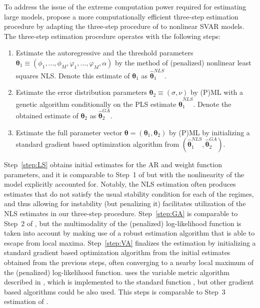 \documentclass[nojss]{jss}
\begin{document}
To address the issue of the extreme computation power required for estimating large models, \cite{Virolainen2:2024} propose a more computationally efficient three-step estimation procedure by adapting the three-step procedure of \cite{Lanne+Meitz+Saikkonen:2017} to nonlinear SVAR models. The three-step estimation procedure operates with the following steps:
\begin{enumerate}
  \item Estimate the autoregressive and the threshold parameters $\boldsymbol{\theta}_1\equiv (\phi_{1},...,\phi_{M},\varphi_1,...,\varphi_M,\alpha)$ by the method of (penalized) nonlinear least squares NLS. Denote this estimate of $\boldsymbol{\theta}_1$ as $\hat{\boldsymbol{\theta}}_1^{NLS}$.\label{step:LS}

  \item Estimate the error distribution parameters $\boldsymbol{\theta}_2\equiv (\sigma,\nu)$ by (P)ML with a genetic algorithm conditionally on the PLS estimate $\hat{\boldsymbol{\theta}}_1^{NLS}$. Denote the obtained estimate of $\boldsymbol{\theta}_2$ as $\hat{\boldsymbol{\theta}}_2^{GA}$.\label{step:GA}

 \item Estimate the full parameter vector $\boldsymbol{\theta}=(\boldsymbol{\theta}_1,\boldsymbol{\theta}_2)$ by (P)ML by initializing a standard gradient based optimization algorithm from $(\hat{\boldsymbol{\theta}}_1^{NLS},\hat{\boldsymbol{\theta}}_2^{GA})$.\label{step:VA}
\end{enumerate}

Step~\ref{step:LS} obtains initial estimates for the AR and weight function parameters, and it is comparable to Step~1 of \cite{Lanne+Meitz+Saikkonen:2017} but with the nonlinearity of the model explicitly accounted for. Notably, the NLS estimation often produces estimates that do not satisfy the usual stability condition for each of the regimes, and thus allowing for instability (but penalizing it) facilitates utilization of the NLS estimates in our three-step procedure. Step~\ref{step:GA} is comparable to Step~2 of \cite{Lanne+Meitz+Saikkonen:2017}, but the multimodality of the (penalized) log-likelihood function is taken into account by making use of a robust estimation algorithm that is able to escape from local maxima. Step~\ref{step:VA} finalizes the estimation by initializing a standard gradient based optimization algorithm from the initial estimates obtained from the previous steps, often converging to a nearby local maximum of the (penalized) log-likelihood function.  uses the variable metric algorithm described in \citep[][Algorithm~21]{Nash:1990}, which is implemented to the standard  function , but other gradient based algorithms could be also used. This steps is comparable to Step~3 estimation of \cite{Lanne+Meitz+Saikkonen:2017}.
\end{document}
